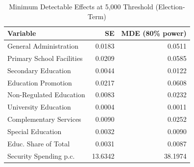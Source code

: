 \begin{table}[!h]
\centering
\caption{\label{tab:mde}Minimum Detectable Effects at 5,000 Threshold (Election-Term)}
\centering
\begin{tabular}[t]{lrr}
\toprule
Variable & SE & MDE (80\% power)\\
\midrule
General Administration & 0.0183 & 0.0511\\
Primary School Facilities & 0.0209 & 0.0585\\
Secondary Education & 0.0044 & 0.0122\\
Education Promotion & 0.0217 & 0.0608\\
Non-Regulated Education & 0.0083 & 0.0232\\
\addlinespace
University Education & 0.0004 & 0.0011\\
Complementary Services & 0.0090 & 0.0252\\
Special Education & 0.0032 & 0.0090\\
Educ. Share of Total & 0.0031 & 0.0087\\
Security Spending p.c. & 13.6342 & 38.1974\\
\bottomrule
\end{tabular}
\end{table}
